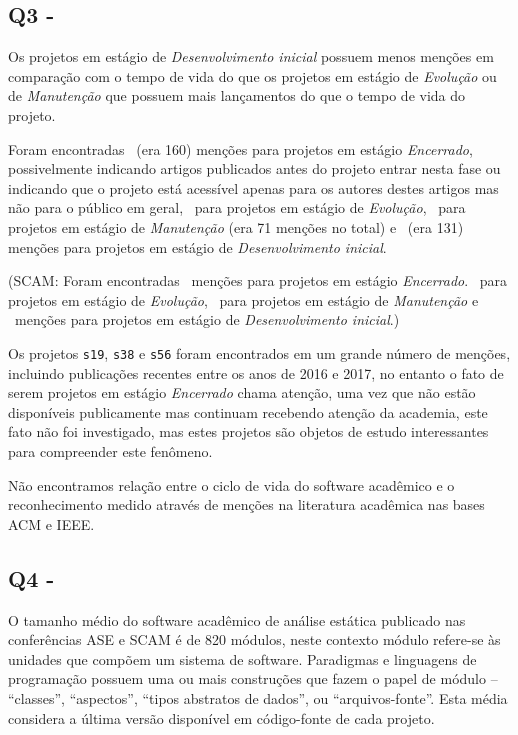\subsection{Q3 - \QuestaoTres} %

Os projetos em estágio de {\it Desenvolvimento inicial} possuem menos menções em
comparação com o tempo de vida do que os
projetos em estágio de {\it Evolução} ou de {\it Manutenção} que
possuem mais lançamentos do que o tempo de vida do projeto.

Foram encontradas \MentionsToClosedownCount \ (era 160) menções para projetos em estágio {\it Encerrado},
possivelmente indicando artigos publicados antes do projeto entrar nesta fase ou indicando que o projeto está acessível apenas para os autores destes artigos mas não para o público em geral,
\MentionsToEvolutionCount \ para projetos em estágio de {\it Evolução},
\MentionsToServicingCount \ para projetos em estágio de {\it Manutenção}
(era 71 menções no total) e 
\MentionsToInitialDevelopmentCount \ (era 131) menções para projetos em estágio de {\it Desenvolvimento inicial}.

(SCAM: Foram encontradas \MentionsToClosedownSCAMCount \ menções para projetos em estágio {\it Encerrado}.
\MentionsToEvolutionSCAMCount \ para projetos em estágio de {\it Evolução},
\MentionsToServicingSCAMCount \ para projetos em estágio de {\it Manutenção} e 
\MentionsToInitialDevelopmentSCAMCount \ menções para projetos em estágio de {\it Desenvolvimento inicial}.)

Os projetos \texttt{s19}, \texttt{s38} e \texttt{s56} foram encontrados em um
grande número de menções, incluindo publicações recentes entre os anos de 2016
e 2017, no entanto o fato de serem projetos em estágio {\it Encerrado} chama
atenção, uma vez que não estão disponíveis publicamente mas continuam recebendo
atenção da academia, este fato não foi investigado, mas estes projetos são
objetos de estudo interessantes para compreender este fenômeno.

Não encontramos relação entre o ciclo de vida do software acadêmico e o reconhecimento
medido através de menções na literatura acadêmica nas bases ACM e IEEE.

\subsection{Q4 - \QuestaoQuatro} %

O tamanho médio do software acadêmico de análise estática publicado nas
conferências ASE e SCAM é de 820 módulos, neste contexto módulo refere-se às
unidades que compõem um sistema de software.  Paradigmas e linguagens de
programação possuem uma ou mais construções que fazem o papel de módulo --
``classes'', ``aspectos'', ``tipos abstratos de dados'', ou ``arquivos-fonte''.
Esta média considera a última versão disponível em código-fonte de cada projeto.

